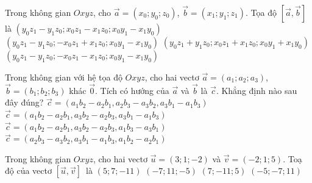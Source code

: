 

\begin{ex}%
	 Trong không gian $Oxyz$, cho $\overrightarrow{a}=\left(x_0;y_0;z_0\right)$, $\overrightarrow{b}=\left(x_1;y_1;z_1\right)$. Tọa độ $\left[\overrightarrow{a},\overrightarrow{b}\right]$ là
	 \choice
		{$\left(y_0z_1-y_1z_0;x_0z_1-x_1z_0;x_0y_1-x_1y_0\right)$} 
		{\True $\left(y_0z_1-y_1z_0;-x_0z_1+x_1z_0;x_0y_1-x_1y_0\right)$} 
		 {$\left(y_0z_1+y_1z_0;x_0z_1+x_1z_0;x_0y_1+x_1y_0\right)$}
		{$\left(y_0z_1-y_1z_0;-x_0z_1-x_1z_0;x_0y_1-x_1y_0\right)$} 
\end{ex}

\begin{ex}%
	Trong không gian với hệ tọa độ $Oxyz$, cho hai vectơ $\overrightarrow{a} = (a_1;a_2;a_3)$,\break $\overrightarrow{b} = (b_1;b_2;b_3)$ khác $\overrightarrow{0}$. Tích  có hướng của $\overrightarrow{a}$ và $\overrightarrow{b}$ là $\overrightarrow{c}$. Khẳng định nào sau đây đúng?
	\choice 
		{$\overrightarrow{c} = (a_1b_2  - a_2b_1, a_2b_3 - a_3b_2, a_3b_1 - a_1b_3)$}
		{$\overrightarrow{c} = (a_1b_2 - a_2b_1, a_3b_2 - a_2b_3,  a_3b_1 - a_1b_3)$}
		{$\overrightarrow{c} = (a_1b_2 - a_2b_1, a_3b_2 - a_2b_3, a_1b_3  - a_3b_1)$}
		{\True $\overrightarrow{c} = (a_2b_3 - a_3b_2,  a_3b_1 - a_1b_3, a_1b_2 - a_2b_1)$}
\end{ex}

\begin{ex}%
	Trong không gian $Oxyz$, cho hai vectơ $\overrightarrow{u}=(3; 1;  -2)$ và $\overrightarrow{v}=(-2; 1; 5)$. Toạ độ của vectơ $\left[\overrightarrow{u}, \overrightarrow{v}\right]$~là
	 \choice
		{$(5;  7; -11)$}
		{$(-7; 11;  -5)$}
		{\True $(7; -11; 5)$} 
		{$(-5; -7;  11)$}
\end{ex}


